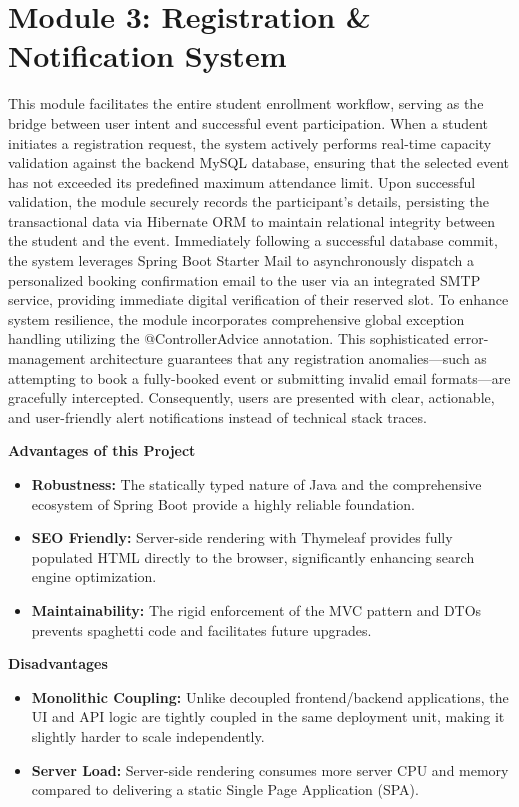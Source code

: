 \documentclass[12pt]{report}
\begin{document}
\section{Module 3: Registration \& Notification System} 
This module facilitates the entire student enrollment workflow, serving as the bridge between user intent and successful event participation. When a student initiates a registration request, the system actively performs real-time capacity validation against the backend MySQL database, ensuring that the selected event has not exceeded its predefined maximum attendance limit. Upon successful validation, the module securely records the participant's details, persisting the transactional data via Hibernate ORM to maintain relational integrity between the student and the event. Immediately following a successful database commit, the system leverages Spring Boot Starter Mail to asynchronously dispatch a personalized booking confirmation email to the user via an integrated SMTP service, providing immediate digital verification of their reserved slot. To enhance system resilience, the module incorporates comprehensive global exception handling utilizing the @ControllerAdvice annotation. This sophisticated error-management architecture guarantees that any registration anomalies---such as attempting to book a fully-booked event or submitting invalid email formats---are gracefully intercepted. Consequently, users are presented with clear, actionable, and user-friendly alert notifications instead of technical stack traces.

\vspace{0.5cm}
\textbf{Advantages of this Project} 

\begin{itemize}
    \item \textbf{Robustness:} The statically typed nature of Java and the comprehensive ecosystem of Spring Boot provide a highly reliable foundation.
    \item \textbf{SEO Friendly:} Server-side rendering with Thymeleaf provides fully populated HTML directly to the browser, significantly enhancing search engine optimization.
    \item \textbf{Maintainability:} The rigid enforcement of the MVC pattern and DTOs prevents spaghetti code and facilitates future upgrades.
\end{itemize}


\vspace{0.5cm}
\textbf{Disadvantages} 

\begin{itemize}
    \item \textbf{Monolithic Coupling:} Unlike decoupled frontend/backend applications, the UI and API logic are tightly coupled in the same deployment unit, making it slightly harder to scale independently.
    \item \textbf{Server Load:} Server-side rendering consumes more server CPU and memory compared to delivering a static Single Page Application (SPA).
\end{itemize}
\vspace{0.3cm}
\end{document}
